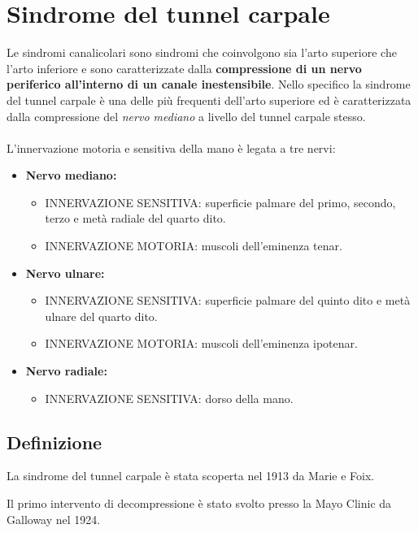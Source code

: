 \section{Sindrome del tunnel carpale}

Le sindromi canalicolari sono sindromi che coinvolgono sia l'arto superiore che l'arto inferiore e sono caratterizzate dalla \textbf{compressione di un nervo periferico all'interno di un canale inestensibile}.
Nello specifico la sindrome del tunnel carpale è una delle più frequenti dell'arto superiore ed è caratterizzata dalla compressione del \emph{nervo mediano} a livello del tunnel carpale stesso.
\\\\
L'innervazione motoria e sensitiva della mano è legata a tre nervi:

\begin{itemize}
\item
  \textbf{Nervo mediano:}
\begin{itemize}
\item
  INNERVAZIONE SENSITIVA: superficie palmare del primo, secondo, terzo e metà radiale del quarto dito.
\item
  INNERVAZIONE MOTORIA: muscoli dell'eminenza tenar.
\end{itemize}

\item
  \textbf{Nervo ulnare:}
\begin{itemize}
\item
  INNERVAZIONE SENSITIVA: superficie palmare del quinto dito e metà ulnare del quarto dito.
\item
  INNERVAZIONE MOTORIA: muscoli dell'eminenza ipotenar.
\end{itemize}

\item
  \textbf{Nervo radiale:}
\begin{itemize}
\item
  INNERVAZIONE SENSITIVA: dorso della mano.
\end{itemize}
\end{itemize}

\subsection{Definizione}

La sindrome del tunnel carpale è stata scoperta nel 1913 da Marie e Foix.

Il primo intervento di decompressione è stato svolto presso la Mayo Clinic da Galloway nel 1924.

